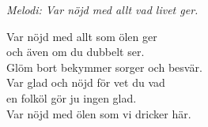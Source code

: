 {\footnotesize\textit{Melodi: Var nöjd med allt vad livet ger.}}\par
\vspace{10pt}
Var nöjd med allt som ölen ger\\
och även om du dubbelt ser.\\
Glöm bort bekymmer sorger och besvär.\\
Var glad och nöjd för vet du vad\\
en folköl gör ju ingen glad.\\
Var nöjd med ölen som vi dricker här.
